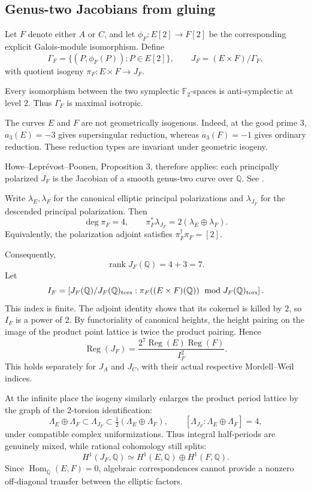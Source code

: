 \documentclass[11pt]{article}
\begin{document}
\subsection{Genus-two Jacobians from gluing}

Let \(F\) denote either \(A\) or \(C\), and let
\(\phi_F:E[2]\to F[2]\) be the corresponding explicit
Galois-module isomorphism. Define
\[
\Gamma_F=\{(P,\phi_F(P)):P\in E[2]\},
\qquad
J_F=(E\times F)/\Gamma_F,
\]
with quotient isogeny \(\pi_F:E\times F\to J_F\).

Every isomorphism between the two symplectic
\(\mathbb F_2\)-spaces is anti-symplectic at level \(2\).
Thus \(\Gamma_F\) is maximal isotropic.

The curves \(E\) and \(F\) are not geometrically
isogenous. Indeed, at the good prime \(3\),
\(a_3(E)=-3\) gives supersingular reduction, whereas
\(a_3(F)=-1\) gives ordinary reduction. These reduction
types are invariant under geometric isogeny.

Howe--Lepr\'evost--Poonen, Proposition 3, therefore
applies: each principally polarized \(J_F\) is the
Jacobian of a smooth genus-two curve over \(\mathbb Q\).
See \cite[Proposition~3]{HLP}.

Write \(\lambda_E,\lambda_F\) for the canonical elliptic
principal polarizations and \(\lambda_{J_F}\) for the
descended principal polarization. Then
\[
\boxed{
\deg\pi_F=4,\qquad
\pi_F^*\lambda_{J_F}
=2(\lambda_E\oplus\lambda_F).
}
\]
Equivalently, the polarization adjoint satisfies
\(\pi_F^\dagger\pi_F=[2]\).

Consequently,
\[
\operatorname{rank}J_F(\mathbb Q)=4+3=7.
\]
Let
\[
I_F=
\left[
J_F(\mathbb Q)/J_F(\mathbb Q)_{\rm tors}:
\pi_F((E\times F)(\mathbb Q))
\ \bmod J_F(\mathbb Q)_{\rm tors}
\right].
\]
This index is finite. The adjoint identity shows that
its cokernel is killed by \(2\), so \(I_F\) is a power
of \(2\). By functoriality of canonical heights, the
height pairing on the image of the product point
lattice is twice the product pairing. Hence
\[
\boxed{
\operatorname{Reg}(J_F)=
\frac{2^7\operatorname{Reg}(E)
                 \operatorname{Reg}(F)}
     {I_F^2}.
}
\]
This holds separately for \(J_A\) and \(J_C\), with
their actual respective Mordell--Weil indices.

At the infinite place the isogeny similarly enlarges
the product period lattice by the graph of the
\(2\)-torsion identification:
\[
\Lambda_E\oplus\Lambda_F
\subset\Lambda_{J_F}
\subset\tfrac12(\Lambda_E\oplus\Lambda_F),
\qquad
[\Lambda_{J_F}:\Lambda_E\oplus\Lambda_F]=4,
\]
under compatible complex uniformizations.
Thus integral half-periods are genuinely mixed,
while rational cohomology still splits:
\[
H^1(J_F,\mathbb Q)
\simeq H^1(E,\mathbb Q)\oplus H^1(F,\mathbb Q).
\]
Since \(\operatorname{Hom}_{\overline{\mathbb Q}}(E,F)=0\),
algebraic correspondences cannot provide a nonzero
off-diagonal transfer between the elliptic factors.
\end{document}
